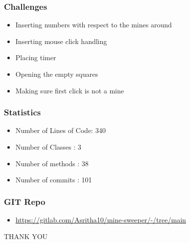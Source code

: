\documentclass[14pt]{beamer}
\begin{document}
    \begin{frame}
	\frametitle{Challenges}
        \begin{itemize}
	     \item Inserting numbers with respect to the mines around
	     \item Inserting mouse click handling
	     \item Placing timer
	     \item Opening the empty squares
	     \item Making sure first click is not a mine
        \end{itemize}
    \end{frame}
    \begin{frame}
	\frametitle{Statistics}
        \begin{itemize}
	     \item Number of Lines of Code: 340
	     \item Number of Classes : 3
	     \item Number of methods : 38
	     \item Number of commits : 101
        \end{itemize}
    \end{frame}
  \begin{frame}
	\frametitle{GIT Repo}
	\begin{itemize}
		\item \url{https://gitlab.com/Asritha10/mine-sweeper/-/tree/main} 
	\end{itemize}
    \end{frame}
    \begin{frame}
	\begin{center}
	     THANK YOU
	\end{center}
    \end{frame}
\end{document}
